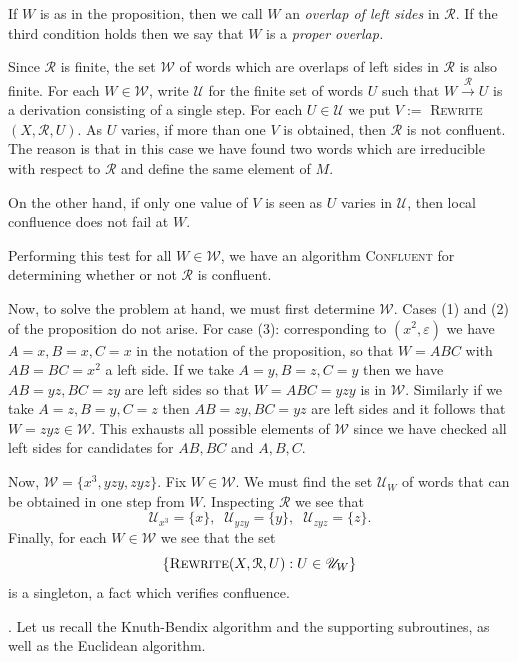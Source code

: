 \documentclass[10pt,a4paper,reqno]{amsart}
\begin{document}
\begin{defn} If $W$ is as in the proposition, then we call $W$ an \emph{overlap
    of left sides} in $\mathcal{R}$. If the third condition holds then we say
    that $W$ is a \emph{proper overlap.}
\end{defn}

Since $\mathcal{R}$ is finite, the set $\mathscr{W}$ of words which are
overlaps of left sides in $\mathcal{R}$ is also finite. For each $W\in
\mathscr{W}$, write $\mathscr{U}$ for the finite set of words $U$ such that $W
\xrightarrow{\mathcal{R}} U$ is a derivation consisting of a single step. For
each $U\in \mathscr{U}$ we put $V :=$ \textsc{Rewrite}$(X,\mathcal{R},U)$.  As
$U$ varies, if more than one $V$ is obtained, then $\mathcal{R}$ is not
confluent. The reason is that in this case we have found two words which are
irreducible with respect to $\mathcal{R}$ and define the same element of $M$.

On the other hand, if only one value of $V$ is seen as $U$ varies in
$\mathscr{U}$, then local confluence does not fail at $W$.

Performing this test for all $W\in \mathscr{W}$, we have an algorithm
\textsc{Confluent} for determining whether or not $\mathcal{R}$ is confluent.

Now, to solve the problem at hand, we must first determine $\mathscr{W}$. Cases
(1) and (2) of the proposition do not arise. For case (3): corresponding to
$(x^2, \varepsilon)$ we have $A=x, B=x, C=x$ in the notation of the
proposition, so that $W = ABC$ with $AB = BC = x^2$ a left side. If we take
$A=y, B=z, C=y$ then we have $AB=yz, BC=zy$ are left sides so that $W=ABC=yzy$
is in $\mathscr{W}$. Similarly if we take $A=z, B=y, C=z$ then $AB=zy, BC=yz$
are left sides and it follows that $W = zyz \in \mathscr{W}$. This exhausts all
possible elements of $\mathscr{W}$ since we have checked all left sides for
candidates for $AB,BC$ and $A,B,C$.

Now, $\mathscr{W} = \{x^3, yzy, zyz\}$. Fix $W\in \mathscr{W}$. We must find
the set $\mathscr{U}_W$ of words that can be obtained in one step from $W$.
Inspecting $\mathcal{R}$ we see that $$\mathscr{U}_{x^3} = \{x\},\;\;
\mathscr{U}_{yzy} = \{y\},\;\; \mathscr{U}_{zyz} = \{z\}.$$ Finally, for each
$W\in \mathscr{W}$ we see that the set $$\{
\text{\textsc{Rewrite}}(X,\mathcal{R},U) : U \in \mathscr{U}_W\}$$ is a
singleton, a fact which verifies confluence.

\bigskip

. Let us recall the Knuth-Bendix algorithm and the supporting subroutines, as well as the Euclidean algorithm.
\end{document}
